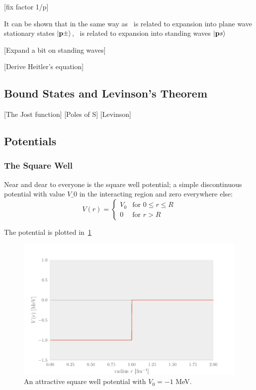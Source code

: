 [fix factor 1/p]

It can be shown that in the same way as\  is related to expansion into
plane wave stationary states \(\ket{\vb{p}\pm}\),\  is related to expansion into standing
waves \(\ket{\vb{p}s}\)

[Expand a bit on standing waves]

[Derive Heitler's equation]
\subsection{Bound States and Levinson's Theorem}
[The Jost function]
[Poles of S]
[Levinson]

\subsection{Potentials}
\subsubsection{The Square Well}
Near and dear to everyone is the square well potential; a simple discontinuous
potential with value \(V\_{0}\) in the interacting region and zero everywhere
else:
\begin{equation*}
  V(r) =
  \begin{cases}
    V_{0} & \text{for } 0 \leq r \leq R\\
    0 & \text{for } r > R 
  \end{cases}
\end{equation*}

The potential is plotted in~\cref{fig:squarewell}

\begin{figure}[H]
  \centering
  \includegraphics[]{Figures/squarewell.pdf}
  \caption{\label{fig:squarewell} An attractive square well potential with
    \(V_{0}=-1\) MeV.}
\end{figure}

